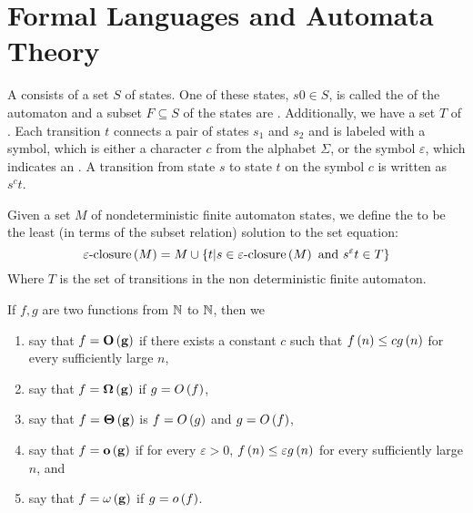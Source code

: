 \chapter{Formal Languages and Automata Theory}

\begin{defi}
A  consists of a set $S$ of states. One of these states, $s0\in S$, is called the  of the automaton and a subset $F\subseteq S$ of the states are . Additionally, we have a set $T$ of . Each transition $t$ connects a pair of states $s_1$ and $s_2$ and is labeled with a symbol, which is either a character $c$ from the alphabet $\Sigma$, or the symbol $\varepsilon$, which indicates an . A transition from state $s$ to state $t$ on the symbol $c$ is written as $s^ct$.\cite{mogensen2009basics}
\end{defi}

\begin{defi}
Given a set $M$ of nondeterministic finite automaton states, we define the  to be the least (in terms of the subset relation) solution to the set equation:
\begin{equation}
\varepsilon\mbox{-closure}\left(M\right) = M\cup \left\{t|s\in \varepsilon\mbox{-closure}\left(M\right)\mbox{ and }s^\varepsilon t\in T \right\}
\end{equation}
Where $T$ is the set of transitions in the non deterministic finite automaton.\cite{mogensen2009basics}
\end{defi}

\begin{defi}
If $f,g$ are two functions from $\mathbb{N}$ to $\mathbb{N}$, then we
\begin{enumerate}
 \item say that $f=\term{\bigoh{g}}$ if there exists a constant $c$ such that $f\left(n\right)\leq cg\left(n\right)$ for every sufficiently large $n$,
 \item say that $f=\term{\bigomega{g}}$ if $g = O\left(f\right)$,
 \item say that $f=\term{\bigtheta{g}}$ is $f = O\left(g\right)$ and $g = O\left(f\right)$,
 \item say that $f=\term{\smalloh{g}}$ if for every $\varepsilon>0$, $f\left(n\right)\leq\varepsilon g\left(n\right)$ for every sufficiently large $n$, and
 \item say that $f=\term{\smallomega{g}}$ if $g=o\left(f\right)$.
\end{enumerate}
\cite{arora2009computational}
\end{defi}

